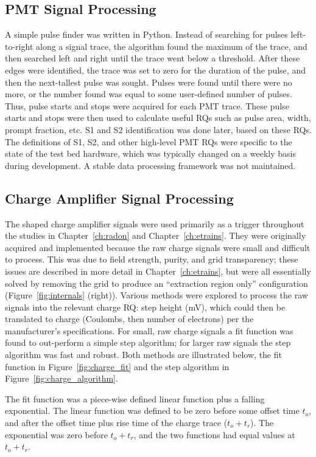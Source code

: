 \subsection{PMT Signal Processing}
A simple pulse finder was written in Python. Instead of searching for pulses left-to-right along a signal trace, the algorithm found the maximum of the trace, and then searched left and right until the trace went below a threshold. After these edges were identified, the trace was set to zero for the duration of the pulse, and then the next-tallest pulse was sought. Pulses were found until there were no more, or the number found was equal to some user-defined number of pulses. Thus, pulse starts and stops were acquired for each \ac{PMT} trace. These pulse starts and stops were then used to calculate useful \ac{RQ}s such as pulse area, width, prompt fraction, etc. S1 and S2 identification was done later, based on these \ac{RQ}s. The definitions of S1, S2, and other high-level \ac{PMT} \ac{RQ}s were specific to the state of the test bed hardware, which was typically changed on a weekly basis during development. A stable data processing framework was not maintained. 

\subsection{Charge Amplifier Signal Processing}
\label{sec:charge_amp_processing}
The shaped charge amplifier signals were used primarily as a trigger throughout the studies in Chapter~\ref{ch:radon} and Chapter~\ref{ch:etrains}. They were originally acquired and implemented because the raw charge signals were small and difficult to process. This was due to field strength, purity, and grid transparency; these issues are described in more detail in Chapter~\ref{ch:etrains}, but were all essentially solved by removing the grid to produce an ``extraction region only'' configuration (Figure~\ref{fig:internals} (right)). Various methods were explored to process the raw signals into the relevant charge \ac{RQ}: step height (mV), which could then be translated to charge (Coulombs, then number of electrons) per the manufacturer's specifications. For small, raw charge signals a fit function was found to out-perform a simple step algorithm; for larger raw signals the step algorithm was fast and robust. Both methods are illustrated below, the fit function in Figure~\ref{fig:charge_fit} and the step algorithm in Figure~\ref{fig:charge_algorithm}. 

The fit function was a piece-wise defined linear function plus a falling exponential. The linear function was defined to be zero before some offset time $t_{o}$, and after the offset time plus rise time of the charge trace ($t_{o} + t_{r}$). The exponential was zero before $t_{o} + t_{r}$, and the two functions had equal values at $t_{o} + t_{r}$. 

